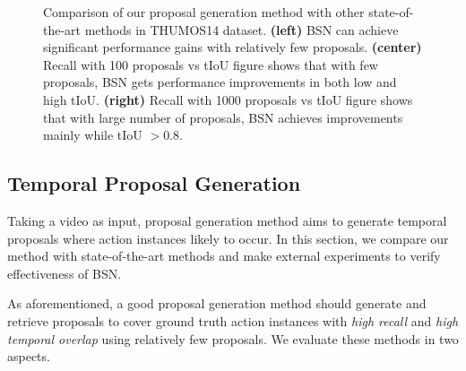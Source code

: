 \documentclass[runningheads]{llncs}
\begin{document}
\begin{figure*}[t]
\setlength{\abovecaptionskip}{-0.2cm} %
\setlength{\belowcaptionskip}{-0.7cm} %
\begin{center}
\begin{minipage}[b]{0.317\linewidth}
\end{minipage}
\hspace{-0.01 in}
\begin{minipage}[b]{0.33\linewidth}
\end{minipage}
\hspace{-0.05 in}
\begin{minipage}[b]{0.33\linewidth}
\end{minipage}
\end{center}
   \caption{Comparison of our proposal generation method with other state-of-the-art methods in THUMOS14 dataset. {\bf (left)} BSN can achieve significant performance gains with relatively few proposals. {\bf (center)} Recall with 100 proposals vs tIoU figure shows that with few proposals, BSN gets performance improvements in both low and high tIoU. {\bf (right)} Recall with 1000 proposals vs tIoU figure shows that with large number of proposals, BSN achieves improvements mainly while tIoU $> 0.8$. }
\label{fig_recall}
\end{figure*}


\vspace{-0.15cm}

\subsection{Temporal Proposal Generation}

Taking a video as input, proposal generation method aims to generate temporal proposals where action instances likely to occur. In this section, we compare our method with state-of-the-art methods and  make external experiments to verify effectiveness of BSN.

As aforementioned, a good proposal generation method should generate and retrieve proposals to cover ground truth action instances with \emph{high recall} and \emph{high temporal overlap}  using relatively few proposals. We evaluate these methods in two aspects.
\end{document}
